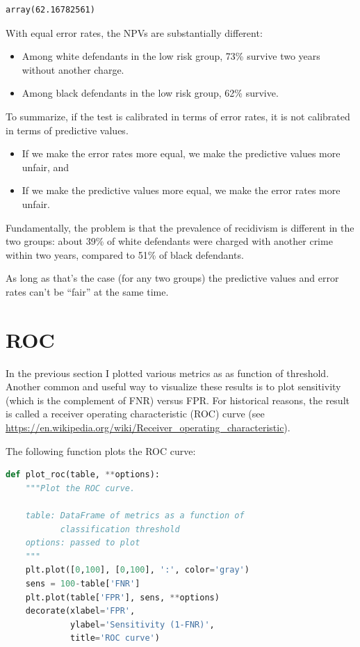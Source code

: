 \begin{lstlisting}[style=output]
array(62.16782561)
\end{lstlisting}

With equal error rates, the NPVs are substantially different:

\begin{itemize}
\item
  Among white defendants in the low risk group, 73\% survive two years
  without another charge.
\item
  Among black defendants in the low risk group, 62\% survive.
\end{itemize}

To summarize, if the test is calibrated in terms of error rates, it is
not calibrated in terms of predictive values.

\begin{itemize}
\item
  If we make the error rates more equal, we make the predictive values
  more unfair, and
\item
  If we make the predictive values more equal, we make the error rates
  more unfair.
\end{itemize}

Fundamentally, the problem is that the prevalence of recidivism is
different in the two groups: about 39\% of white defendants were charged
with another crime within two years, compared to 51\% of black
defendants.

As long as that's the case (for any two groups) the predictive values
and error rates can't be ``fair'' at the same time.

\hypertarget{roc}{%
\section{ROC}\label{roc}}

In the previous section I plotted various metrics as as function of
threshold. Another common and useful way to visualize these results is
to plot sensitivity (which is the complement of FNR) versus FPR. For
historical reasons, the result is called a receiver operating
characteristic (ROC) curve (see
\url{https://en.wikipedia.org/wiki/Receiver_operating_characteristic}).

The following function plots the ROC curve:

\begin{lstlisting}[language=Python,style=source]
def plot_roc(table, **options):
    """Plot the ROC curve.
    
    table: DataFrame of metrics as a function of 
           classification threshold
    options: passed to plot
    """
    plt.plot([0,100], [0,100], ':', color='gray')
    sens = 100-table['FNR']
    plt.plot(table['FPR'], sens, **options)
    decorate(xlabel='FPR',
             ylabel='Sensitivity (1-FNR)',
             title='ROC curve')
\end{lstlisting}


